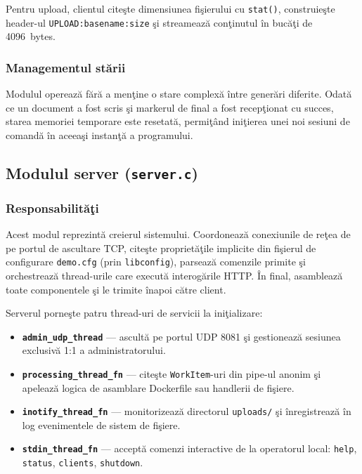 \documentclass[12pt, a4paper]{article}
\begin{document}
Pentru upload, clientul cite\c{s}te dimensiunea fi\c{s}ierului cu \texttt{stat()}, construie\c{s}te
header-ul \texttt{UPLOAD:basename:size} \c{s}i streameaz\u{a} con\c{t}inutul \^{i}n buc\u{a}\c{t}i
de 4096~bytes.

\subsubsection{Managementul st\u{a}rii}

Modulul opereaz\u{a} f\u{a}r\u{a} a men\c{t}ine o stare complex\u{a} \^{i}ntre gener\u{a}ri diferite.
Odat\u{a} ce un document a fost scris \c{s}i markerul de final a fost recep\c{t}ionat cu succes,
starea memoriei temporare este resetat\u{a}, permi\c{t}ând ini\c{t}ierea unei noi sesiuni de
comand\u{a} \^{i}n aceea\c{s}i instan\c{t}\u{a} a programului.

\subsection{Modulul server (\texttt{server.c})}

\subsubsection{Responsabilit\u{a}\c{t}i}

Acest modul reprezint\u{a} creierul sistemului. Coordoneaz\u{a} conexiunile de re\c{t}ea de pe portul
de ascultare TCP, cite\c{s}te propriet\u{a}\c{t}ile implicite din fi\c{s}ierul de configurare
\texttt{demo.cfg} (prin \texttt{libconfig}), parseaz\u{a} comenzile primite \c{s}i orchestreaz\u{a}
thread-urile care execut\u{a} interog\u{a}rile HTTP. \^{I}n final, asambleaz\u{a} toate
componentele \c{s}i le trimite \^{i}napoi c\u{a}tre client.

Serverul porne\c{s}te patru thread-uri de servicii la ini\c{t}ializare:

\begin{itemize}
    \item \textbf{\texttt{admin\_udp\_thread}} --- ascult\u{a} pe portul UDP 8081 \c{s}i gestioneaz\u{a}
    sesiunea exclusiv\u{a} 1:1 a administratorului.
    \item \textbf{\texttt{processing\_thread\_fn}} --- cite\c{s}te \texttt{WorkItem}-uri din pipe-ul
    anonim \c{s}i apeleaz\u{a} logica de asamblare Dockerfile sau handlerii de fi\c{s}iere.
    \item \textbf{\texttt{inotify\_thread\_fn}} --- monitorizeaz\u{a} directorul \texttt{uploads/}
    \c{s}i \^{i}nregistreaz\u{a} \^{i}n log evenimentele de sistem de fi\c{s}iere.
    \item \textbf{\texttt{stdin\_thread\_fn}} --- accept\u{a} comenzi interactive de la operatorul
    local: \texttt{help}, \texttt{status}, \texttt{clients}, \texttt{shutdown}.
\end{itemize}
\end{document}
